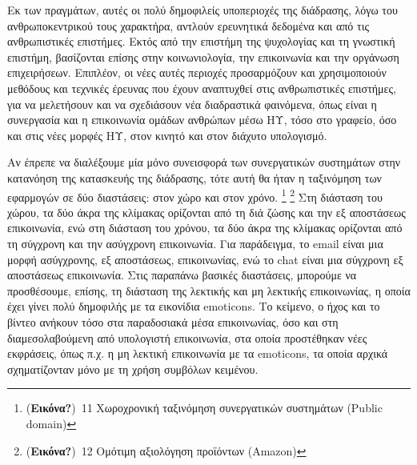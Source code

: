 \documentclass[
]{article}
\begin{document}
Εκ των πραγμάτων, αυτές οι πολύ δημοφιλείς υποπεριοχές της διάδρασης,
λόγω του ανθρωποκεντρικού τους χαρακτήρα, αντλούν ερευνητικά δεδομένα
και από τις ανθρωπιστικές επιστήμες. Εκτός από την επιστήμη της
ψυχολογίας και τη γνωστική επιστήμη, βασίζονται επίσης στην
κοινωνιολογία, την επικοινωνία και την οργάνωση επιχειρήσεων. Επιπλέον,
οι νέες αυτές περιοχές προσαρμόζουν και χρησιμοποιούν μεθόδους και
τεχνικές έρευνας που έχουν αναπτυχθεί στις ανθρωπιστικές επιστήμες, για
να μελετήσουν και να σχεδιάσουν νέα διαδραστικά φαινόμενα, όπως είναι η
συνεργασία και η επικοινωνία ομάδων ανθρώπων μέσω ΗΥ, τόσο στο γραφείο,
όσο και στις νέες μορφές ΗΥ, στον κινητό και στον διάχυτο υπολογισμό.

Αν έπρεπε να διαλέξουμε μία μόνο συνεισφορά των συνεργατικών συστημάτων
στην κατανόηση της κατασκευής της διάδρασης, τότε αυτή θα ήταν η
ταξινόμηση των εφαρμογών σε δύο διαστάσεις: στον χώρο και στον χρόνο.
\footnote{(\textbf{Εικόνα?})~11 Χωροχρονική ταξινόμηση συνεργατικών
  συστημάτων (Public domain)} \footnote{(\textbf{Εικόνα?})~12 Ομότιμη
  αξιολόγηση προϊόντων (Amazon)} Στη διάσταση του χώρου, τα δύο άκρα της
κλίμακας ορίζονται από τη διά ζώσης και την εξ αποστάσεως επικοινωνία,
ενώ στη διάσταση του χρόνου, τα δύο άκρα της κλίμακας ορίζονται από τη
σύγχρονη και την ασύγχρονη επικοινωνία. Για παράδειγμα, το email είναι
μια μορφή ασύγχρονης, εξ αποστάσεως, επικοινωνίας, ενώ το chat είναι μια
σύγχρονη εξ αποστάσεως επικοινωνία. Στις παραπάνω βασικές διαστάσεις,
μπορούμε να προσθέσουμε, επίσης, τη διάσταση της λεκτικής και μη
λεκτικής επικοινωνίας, η οποία έχει γίνει πολύ δημοφιλής με τα εικονίδια
emoticons. Το κείμενο, ο ήχος και το βίντεο ανήκουν τόσο στα παραδοσιακά
μέσα επικοινωνίας, όσο και στη διαμεσολαβούμενη από υπολογιστή
επικοινωνία, στα οποία προστέθηκαν νέες εκφράσεις, όπως π.χ. η μη
λεκτική επικοινωνία με τα emoticons, τα οποία αρχικά σχηματίζονταν μόνο
με τη χρήση συμβόλων κειμένου.
\end{document}
